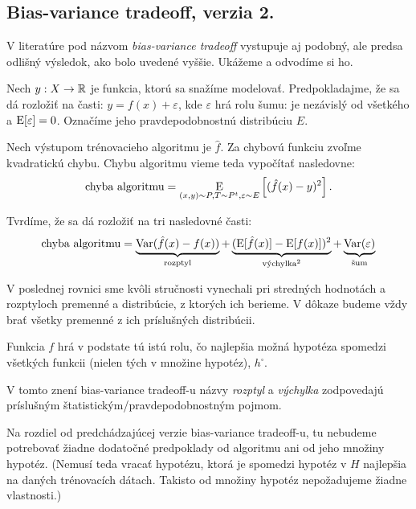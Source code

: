 


\subsection{Bias-variance tradeoff, verzia 2.}
V literatúre pod názvom \emph{bias-variance tradeoff} vystupuje aj
podobný, ale predsa odlišný výsledok, ako bolo uvedené vyššie.
Ukážeme a odvodíme si ho.

\begin{theorem}
  Nech $y : X \to \mathbb{R}$ je funkcia, ktorú sa snažíme modelovať.
  Predpokladajme, že sa dá rozložiť na časti: $y = f(x) + \varepsilon$,
  kde $\varepsilon$ hrá rolu šumu: je nezávislý od všetkého a
  $\operatorname*{\mathrm{E}}[\varepsilon] = 0$. Označíme jeho pravdepodobnostnú distribúciu
  $E$.
  
  Nech výstupom trénovacieho algoritmu je $\hat{f}$. Za chybovú
  funkciu zvoľme kvadratickú chybu. Chybu algoritmu vieme teda
  vypočítať nasledovne:
  $$\text{\normalfont chyba algoritmu} = \operatorname*{\mathrm{E}}_{(x, y) \sim P, T \sim P^t, \varepsilon \sim E} \left[ (\hat{f}(x) - y)^2 \right].$$
  
  Tvrdíme, že sa dá rozložiť na tri nasledovné časti:
  $$
  \text{\normalfont chyba algoritmu}
      = \underbrace{\operatorname*{\mathrm{Var}}(\hat{f}(x) - f(x))}_{\text{\normalfont rozptyl}}
      + \underbrace{(\operatorname*{\mathrm{E}}[\hat{f}(x)] - \operatorname*{\mathrm{E}}[f(x)])^2}_{\text{\normalfont výchylka}^2}
      + \underbrace{\operatorname*{\mathrm{Var}}(\varepsilon)}_{\text{\normalfont šum}}
  $$
\end{theorem}
\begin{remark}
  V poslednej rovnici sme kvôli stručnosti vynechali pri stredných
  hodnotách a rozptyloch premenné a distribúcie, z ktorých ich berieme.
  V dôkaze budeme vždy brať všetky premenné z ich príslušných distribúcii.
\end{remark}
\begin{remark}
  Funkcia $f$ hrá v podstate tú istú rolu, čo najlepšia možná hypotéza
  spomedzi všetkých funkcii (nielen tých v množine hypotéz), $h^\square$.
\end{remark}
\begin{remark}
  V tomto znení bias-variance tradeoff-u názvy \emph{rozptyl} a
  \emph{výchylka} zodpovedajú príslušným štatistickým/pravdepodobnostným
  pojmom.
\end{remark}
\begin{remark}
  Na rozdiel od predchádzajúcej verzie bias-variance tradeoff-u, tu
  nebudeme potrebovať žiadne dodatočné predpoklady od algoritmu ani
  od jeho množiny hypotéz. (Nemusí teda vracať hypotézu, ktorá je
  spomedzi hypotéz v $H$ najlepšia na daných trénovacích dátach.
  Takisto od množiny hypotéz nepožadujeme žiadne vlastnosti.)
\end{remark}
